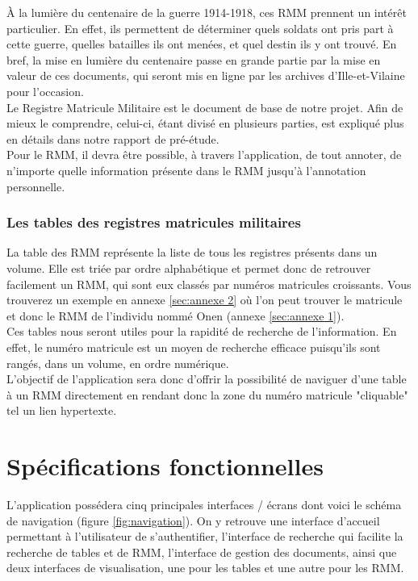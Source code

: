 \documentclass[a4paper]{article}
\begin{document}
	\`A la lumière du centenaire de la guerre 1914-1918, ces RMM prennent un intérêt particulier. En effet, ils permettent de déterminer quels soldats ont pris part à cette guerre, quelles batailles ils ont menées, et quel destin ils y ont trouvé. En bref, la mise en lumière du centenaire passe en grande partie par la mise en valeur de ces documents, qui seront mis en ligne par les archives d'Ille-et-Vilaine pour l'occasion.\\

	Le Registre Matricule Militaire est le document de base de notre projet. Afin de mieux le comprendre, celui-ci, étant divisé en plusieurs parties, est expliqué plus en détails dans notre rapport de pré-étude.\\

	Pour le RMM, il devra être possible, à travers l'application, de tout annoter, de n'importe quelle information présente dans le RMM jusqu'à l'annotation personnelle. 

\subsubsection{Les tables des registres matricules militaires}
	La table des RMM représente la liste de tous les registres présents dans un volume. Elle est triée par ordre alphabétique et permet donc de retrouver facilement un RMM, qui sont eux classés par numéros matricules croissants. Vous trouverez un exemple en annexe \ref{sec:annexe 2} où l'on peut trouver le matricule et donc le RMM de l'individu nommé Onen (annexe \ref{sec:annexe 1}).\\

	Ces tables nous seront utiles pour la rapidité de recherche de l'information. En effet, le numéro matricule est un moyen de recherche efficace puisqu'ils sont rangés, dans un volume, en ordre numérique. \\

	L'objectif de l'application sera donc d'offrir la possibilité de naviguer d'une table à un RMM directement en rendant donc la zone du numéro matricule "cliquable" tel un lien hypertexte.\\

\section{Spécifications fonctionnelles}

	L’application possédera cinq principales interfaces / écrans dont voici le schéma de navigation (figure \ref{fig:navigation}). On y retrouve une interface d'accueil permettant à l'utilisateur de s'authentifier, l'interface de recherche qui facilite la recherche de tables et de RMM, l'interface de gestion des documents, ainsi que deux interfaces de visualisation, une pour les tables et une autre pour les RMM.
\end{document}
